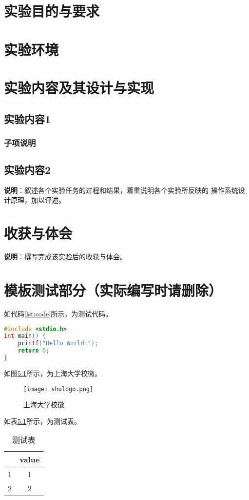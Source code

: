 \chapter{实验目的与要求}

\chapter{实验环境}

\chapter{实验内容及其设计与实现}

\section{实验内容1}

\subsection{子项说明}

\section{实验内容2}

\textbf{说明}：叙述各个实验任务的过程和结果，着重说明各个实验所反映的
操作系统设计原理，加以评述。

\chapter{收获与体会}

\textbf{说明}：撰写完成该实验后的收获与体会。

\chapter{模板测试部分（实际编写时请删除）}

如代码\ref{lst:code}所示，为测试代码。

\begin{lstlisting}[language=C, caption={测试代码}, label={lst:code}]
#include <stdio.h>
int main() {
    printf("Hello World!");
    return 0;
}
\end{lstlisting}

如图\ref{fig:example}所示，为上海大学校徽。

\begin{figure}[!htbp]
    \centering
    \texttt{[image: shulogo.png]}
    \caption{上海大学校徽}
    \label{fig:example}
\end{figure}

\newpage
如表\ref{tab:example}所示，为测试表。

\begin{table}[!htbp]
    \caption{测试表}
    \label{tab:example}
    \centering
    \begin{tabular}{cc}
        \toprule
            & value\\
        \midrule
        1   & 1     \\
        2   & 2     \\
        \bottomrule
    \end{tabular}
\end{table}